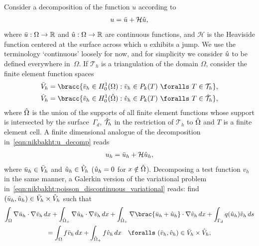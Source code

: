 Consider a decomposition of the function $u$ according to
%
\begin{equation}
  u = \Bar{u} + \mathcal{H} \Hat{u},
\label{eqn:nikbakht:u_decomp}
\end{equation}
%
where $\Bar{u}: \Omega \rightarrow \mathbb{R}$ and $\Hat{u}: \Omega
\rightarrow \mathbb{R}$ are continuous functions, and $\mathcal{H}$ is
the Heaviside function centered at the surface across which $u$ exhibits
a jump.  We use the terminology `continuous' loosely for now, and for
simplicity we consider $\Hat{u}$ to be defined everywhere in~$\Omega$.
If $\mathcal{T}_h$ is a triangulation of the domain $\Omega$, consider
the finite element function spaces
%
\begin{align}
  \Bar{V}_{h} &= \bracc{\Bar{v}_{h} \in H^{1}_{0}(\Omega)
                    : \Bar{v}_{h} \in P_{k}(T) \ \foralls \ T \in \mathcal{T}_h},
\\
  \Hat{V}_{h} &= \bracc{\Hat{v}_{h} \in H^{1}_{0}(\Hat{\Omega})
                    : \Hat{v}_{h} \in P_{k}(T) \ \foralls \ T \in \Hat{\mathcal{T}}_h},
\end{align}
%
where $\Hat{\Omega}$ is the union of the supports of all finite element
functions whose support is intersected by the surface~$\Gamma_{d}$,
$\Hat{\mathcal{T}}_h$ in the restriction of $\mathcal{T}_h$ to $\Hat{\Omega}$
and $T$ is a finite element cell. A finite dimensional analogue of the
decomposition in~\eqref{eqn:nikbakht:u_decomp} reads
%
\begin{equation}
  u_{h} = \Bar{u}_{h} + \mathcal{H} \Hat{u}_{h},
  \label{eqn:nikbakht:u_h_decomp}
\end{equation}
%
where $\Bar{u}_{h} \in \Bar{V}_{h}$ and $\Hat{u}_{h}
\in \Hat{V}_{h}$ ($\Hat{u}_{h} = 0$ for $x \notin
\Hat{\Omega}$).  Decomposing a test function $v_{h}$ in the
same manner, a Galerkin version of the variational problem
in~\eqref{eqn:nikbakht:poisson_discontinuous_variational} reads: find
$(\Bar{u}_{h}, \Hat{u}_{h}) \in \Bar{V}_{h} \times \Hat{V}_{h}$ such that
%
\begin{multline}
     \int_{\Omega} \nabla \Bar{u}_{h} \cdot \nabla \Bar{v}_{h} \dif x
     + \int_{\Hat{\Omega}_{+}} \nabla \Hat{u}_{h} \cdot  \nabla \Bar{v}_{h} \dif x
     + \int_{\Hat{\Omega}_{+}}  \nabla \brac{\Bar{u}_{h} + \Hat{u}_{h}} \cdot \nabla \Hat{v}_{h} \dif x
     + \int_{\Gamma_d} q(\Hat{u}_h)\Hat{v}_h \dif s
\\
  =
   \int_{\Omega} f \Bar{v}_{h} \dif x
 + \int_{\Hat{\Omega}_{+}}  f \Hat{v}_{h} \dif x
      \quad \foralls \ (\Bar{v}_{h}, \Hat{v}_{h}) \in \Bar{V}_{h} \times \Hat{V}_{h},
\label{eqn:nikbakht:poisson_expanded_discontinuous_variational}
\end{multline}
